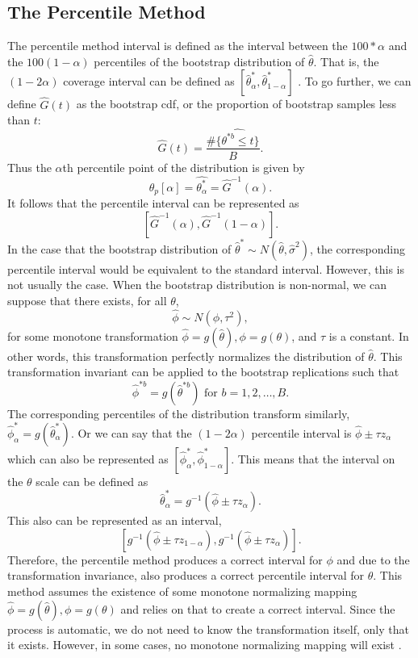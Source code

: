 \documentclass[12pt]{article}
\begin{document}
\hypertarget{the-percentile-method}{%
\subsection{The Percentile Method}\label{the-percentile-method}}

The percentile method interval is defined as the interval between the
\(100 * \alpha\) and the \(100(1 - \alpha)\) percentiles of the
bootstrap distribution of \(\hat{\theta}\). That is, the
\((1 - 2\alpha)\) coverage interval can be defined as
\([\hat{\theta}^*_\alpha,\hat{\theta}^*_{1-\alpha}]\)
\citep[\citet{EfronCasi}]{Efron86}. To go further, we can define
\(\hat{G}(t)\) as the bootstrap cdf, or the proportion of bootstrap
samples less than \(t\):
\[\hat{G}(t) = \frac{\#\{\hat{\theta^{*b} \leq t}\}}{B}.\] Thus the
\(\alpha\)th percentile point of the distribution is given by
\[\hat{\theta}_p[\alpha] = \hat{\theta^*_\alpha} = \hat{G}^{-1}(\alpha).\]
It follows that the percentile interval can be represented as
\[\left [ \hat{G}^{-1}(\alpha),\hat{G}^{-1}(1-\alpha) \right ].\] In the
case that the bootstrap distribution of
\(\hat{\theta}^* \sim N(\hat{\theta}, \hat{\sigma}^2)\), the
corresponding percentile interval would be equivalent to the standard
interval. However, this is not usually the case. When the bootstrap
distribution is non-normal, we can suppose that there exists, for all
\(\theta\), \[\hat{\phi} \sim N(\phi, \tau^2),\] for some monotone
transformation \(\hat{\phi} = g(\hat{\theta}), \phi = g(\theta)\), and
\(\tau\) is a constant. In other words, this transformation perfectly
normalizes the distribution of \(\hat{\theta}\). This transformation
invariant can be applied to the bootstrap replications such that
\[\hat{\phi}^{*b} = g\left( \hat{\theta}^{*b}\right ) \text{ for } b = 1,2,\dots, B.\]
The corresponding percentiles of the distribution transform similarly,
\(\hat{\phi}^*_\alpha = g \left ( \hat{\theta}^*_\alpha \right )\). Or
we can say that the \((1 - 2\alpha)\) percentile interval is
\(\hat{\phi} \pm \tau z_\alpha\) which can also be represented as
\([\hat{\phi}^*_\alpha,\hat{\phi}^*_{1-\alpha}]\). This means that the
interval on the \(\theta\) scale can be defined as
\[\hat{\theta}^*_\alpha = g^{-1}(\hat{\phi} \pm \tau z_\alpha).\] This
also can be represented as an interval,
\[\left [ g^{-1}(\hat{\phi} \pm \tau z_{1-\alpha}), g^{-1}(\hat{\phi} \pm \tau z_\alpha) \right ].\]
Therefore, the percentile method produces a correct interval for
\(\phi\) and due to the transformation invariance, also produces a
correct percentile interval for \(\theta\). This method assumes the
existence of some monotone normalizing mapping
\(\hat{\phi} = g(\hat{\theta}), \phi = g(\theta)\) and relies on that to
create a correct interval. Since the process is automatic, we do not
need to know the transformation itself, only that it exists. However, in
some cases, no monotone normalizing mapping will exist \citep{Efron86}.
\end{document}
